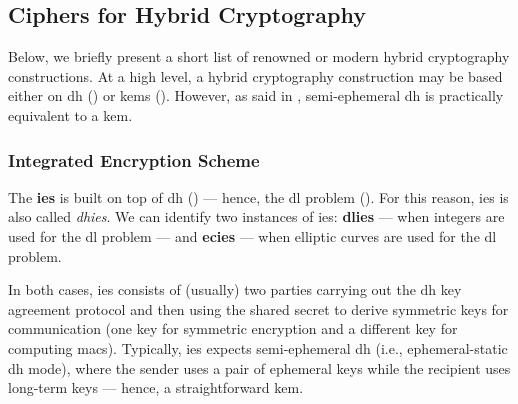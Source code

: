\subsection{Ciphers for Hybrid Cryptography}\label{sec:hybrid_cryptography:ciphers}

Below, we briefly present a short list of renowned or modern hybrid cryptography constructions. At a high level, a hybrid cryptography construction may be based either on \gls{dh} () or \glspl{kem} (). However, as said in , semi-ephemeral \gls{dh} is practically equivalent to a \gls{kem}.





\subsubsection{Integrated Encryption Scheme}\label{sec:hybrid_cryptography:ciphers:ies}

The \textbf{\gls{ies}} is built on top of \gls{dh} () --- hence, the \gls{dl} problem (). For this reason, \gls{ies} is also called \textit{\gls{dhies}}. We can identify two instances of \gls{ies}: \textbf{\gls{dlies}} --- when integers are used for the \gls{dl} problem --- and \textbf{\gls{ecies}} --- when elliptic curves are used for the \gls{dl} problem.

In both cases, \gls{ies} consists of (usually) two parties carrying out the \gls{dh} key agreement protocol and then using the shared secret to derive symmetric keys for communication (one key for symmetric encryption and a different key for computing \glspl{mac}). Typically, \gls{ies} expects semi-ephemeral \gls{dh} (i.e., ephemeral-static \gls{dh} mode), where the sender uses a pair of ephemeral keys while the recipient uses long-term keys --- hence, a straightforward \gls{kem}.

